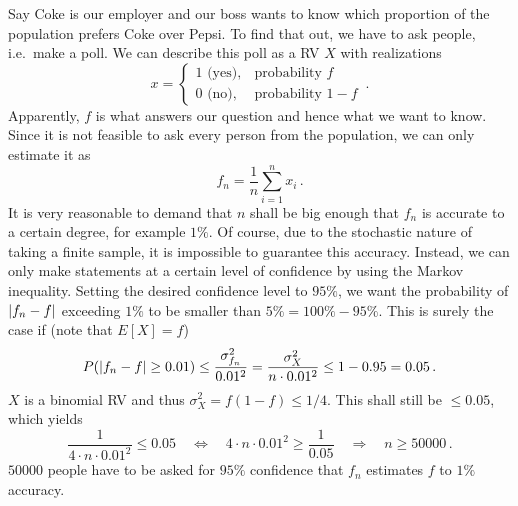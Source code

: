 \begin{ex}
Say Coke is our employer and our boss wants to know which proportion of the population prefers Coke over Pepsi. To find that out, we have to ask people, i.e.~make a poll. We can describe this poll as a RV $X$ with realizations
\begin{equation*}
x = \begin{cases} 1 \text{ (yes)}, & \text{probability } f \\ 0 \text{ (no)}, & \text{probability } 1 - f \end{cases} \, .
\end{equation*}
Apparently, $f$ is what answers our question and hence what we want to know. Since it is not feasible to ask every person from the population, we can only estimate it as
\begin{equation*}
f_n = \frac{1}{n} \sum_{i = 1}^n x_i \, .
\end{equation*}
It is very reasonable to demand that $n$ shall be big enough that $f_n$ is accurate to a certain degree, for example $1\%$. Of course, due to the stochastic nature of taking a finite sample, it is impossible to guarantee this accuracy. Instead, we can only make statements at a certain level of confidence by using the Markov inequality. Setting the desired confidence level to $95\%$, we want the probability of $\abs{f_n - f}$ exceeding $1\%$ to be smaller than $5\% = 100\% - 95\%$. This is surely the case if (note that $E[X] = f$)
\begin{equation*}
P(\abs{f_n - f} \geq 0.01) \leq \frac{\sigma_{f_n}^2}{0.01^2} = \frac{\sigma_X^2}{n \cdot 0.01^2} \leq 1 - 0.95 = 0.05 \, .
\end{equation*}
$X$ is a binomial RV and thus $\sigma_X^2 = f (1 - f) \leq 1 / 4$. This shall still be $\leq 0.05$, which yields
\begin{equation*}
\frac{1}{4 \cdot n \cdot 0.01^2} \leq 0.05 \quad \Leftrightarrow \quad 4 \cdot n \cdot 0.01^2 \geq \frac{1}{0.05} \quad \Rightarrow \quad n \geq 50 000 \,. 
\end{equation*}
$50 000$ people have to be asked for $95\%$ confidence that $f_n$ estimates $f$ to $1\%$ accuracy.
\end{ex}


